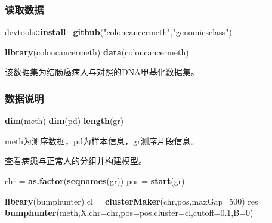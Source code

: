\documentclass[]{book}
\newenvironment{Shaded}{\begin{snugshade}}{\end{snugshade}}
\newcommand{\DataTypeTok}[1]{\textcolor[rgb]{0.13,0.29,0.53}{#1}}
\newcommand{\DecValTok}[1]{\textcolor[rgb]{0.00,0.00,0.81}{#1}}
\newcommand{\FloatTok}[1]{\textcolor[rgb]{0.00,0.00,0.81}{#1}}
\newcommand{\KeywordTok}[1]{\textcolor[rgb]{0.13,0.29,0.53}{\textbf{#1}}}
\newcommand{\NormalTok}[1]{#1}
\newcommand{\OperatorTok}[1]{\textcolor[rgb]{0.81,0.36,0.00}{\textbf{#1}}}
\newcommand{\StringTok}[1]{\textcolor[rgb]{0.31,0.60,0.02}{#1}}
\begin{document}
\hypertarget{-1}{%
\subsubsection{读取数据}\label{-1}}

\begin{Shaded}
\begin{Highlighting}[]
\NormalTok{devtools}\OperatorTok{::}\KeywordTok{install_github}\NormalTok{(}\StringTok{"coloncancermeth"}\NormalTok{,}\StringTok{"genomicsclass"}\NormalTok{)}

\KeywordTok{library}\NormalTok{(coloncancermeth)}
\KeywordTok{data}\NormalTok{(coloncancermeth)}
\end{Highlighting}
\end{Shaded}

该数据集为结肠癌病人与对照的DNA甲基化数据集。

\subsubsection{数据说明}

\begin{Shaded}
\begin{Highlighting}[]
\KeywordTok{dim}\NormalTok{(meth)}
\KeywordTok{dim}\NormalTok{(pd)}
\KeywordTok{length}\NormalTok{(gr)}
\end{Highlighting}
\end{Shaded}

meth为测序数据，pd为样本信息，gr测序片段信息。

\begin{Shaded}
\end{Shaded}

查看病患与正常人的分组并构建模型。

\begin{Shaded}
\begin{Highlighting}[]
\NormalTok{chr =}\StringTok{ }\KeywordTok{as.factor}\NormalTok{(}\KeywordTok{seqnames}\NormalTok{(gr))}
\NormalTok{pos =}\StringTok{ }\KeywordTok{start}\NormalTok{(gr)}

\KeywordTok{library}\NormalTok{(bumphunter)}
\NormalTok{cl =}\StringTok{ }\KeywordTok{clusterMaker}\NormalTok{(chr,pos,}\DataTypeTok{maxGap=}\DecValTok{500}\NormalTok{)}
\NormalTok{res =}\StringTok{ }\KeywordTok{bumphunter}\NormalTok{(meth,X,}\DataTypeTok{chr=}\NormalTok{chr,}\DataTypeTok{pos=}\NormalTok{pos,}\DataTypeTok{cluster=}\NormalTok{cl,}\DataTypeTok{cutoff=}\FloatTok{0.1}\NormalTok{,}\DataTypeTok{B=}\DecValTok{0}\NormalTok{)}
\end{Highlighting}
\end{Shaded}
\end{document}
